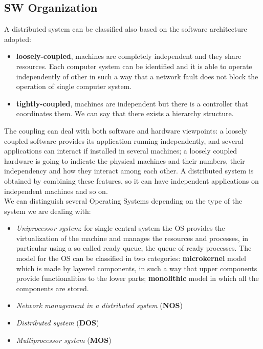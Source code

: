 \documentclass[11pt,a4paper]{article}
\begin{document}
\subsection{SW Organization}
A distributed system can be classified also based on the software architecture adopted:
\begin{itemize}
	\item \textbf{loosely-coupled}, machines are completely independent and they share resources. Each computer system can be identified and it is able to operate independently of other in such a way that a network fault does not block the operation of single computer system.  
	\item \textbf{tightly-coupled},  machines are independent but there is a controller that coordinates them. We can say that there exists a hierarchy structure.
\end{itemize}
The coupling can deal with both software and hardware viewpoints: a loosely coupled software provides its application running independently, and several applications can interact if installed in several machines; a loosely coupled hardware is going to indicate the physical machines and their numbers, their independency and how they interact among each other. A distributed system is obtained by combining these features, so it can have independent applications on independent machines and so on.\\
We can distinguish several Operating Systems depending on the type of the system we are dealing with:
\begin{itemize}
	\item \textit{Uniprocessor system}: for single central system the OS provides the virtualization of the machine and manages the resources and processes, in particular using a so called ready queue, the queue of ready processes. The model for the OS can be classified in two categories: \textbf{microkernel} model which is made by layered components, in such a way that upper components provide functionalities to the lower parts; \textbf{monolithic} model in which all the components are stored.
	\item \textit{Network management in a distributed system} (\textbf{NOS})
	\item \textit{Distributed system} (\textbf{DOS})
	\item \textit{Multiprocessor system} (\textbf{MOS})
\end{itemize}
\end{document}
